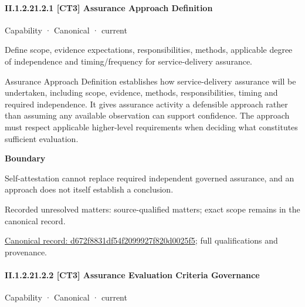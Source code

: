 \paragraph*{II.1.2.21.2.1 [CT3] Assurance Approach Definition}
\label{navigation:II.1.2.21.2.1}

\label{element:d672f8831df54f2099927f820d0025f5}
{\small Capability · Canonical · current}\par

Define scope, evidence expectations, responsibilities, methods, applicable degree of independence and timing/frequency for service-delivery assurance.



Assurance Approach Definition establishes how service-delivery assurance will be undertaken, including scope, evidence, methods, responsibilities, timing and required independence. It gives assurance activity a defensible approach rather than assuming any available observation can support confidence. The approach must respect applicable higher-level requirements when deciding what constitutes sufficient evaluation.



\textbf{Boundary}



Self-attestation cannot replace required independent governed assurance, and an approach does not itself establish a conclusion.


{\small Recorded unresolved matters: source-qualified matters; exact scope remains in the canonical record.}\par
{\footnotesize \href{../../../../continuum/strategy/capability/d672f8831df54f2099927f820d0025f5.md}{Canonical record: d672f8831df54f2099927f820d0025f5}; full qualifications and provenance.}\par
\paragraph*{II.1.2.21.2.2 [CT3] Assurance Evaluation Criteria Governance}
\label{navigation:II.1.2.21.2.2}

\label{element:f3e32f2a2c9d47a89eaf124647161522}
{\small Capability · Canonical · current}\par


